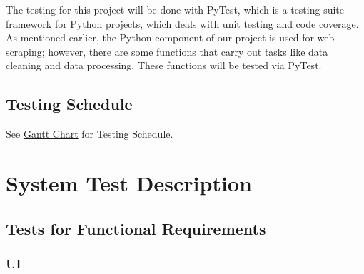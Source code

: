 \documentclass[12pt, titlepage]{article}
\begin{document}
The testing for this project will be done with PyTest, which is a testing suite framework for Python projects, which deals with unit testing and code coverage. As mentioned earlier, the Python component of our project is used for web-scraping; however, there are some functions that carry out tasks like data cleaning and data processing. These functions will be tested via PyTest.

\subsection{Testing Schedule}

See \href{https://gitlab.cas.mcmaster.ca/renx11/3xa3-project-l02-group9/-/blob/master/ProjectSchedule/EuenvaGantt.pdf}{Gantt Chart} for Testing Schedule.

\section{System Test Description}

\subsection{Tests for Functional Requirements}


\subsubsection{UI}
\end{document}
